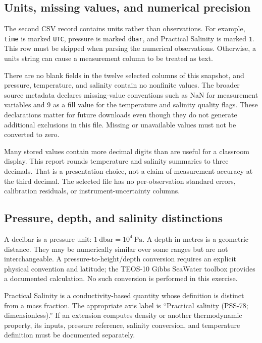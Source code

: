 \documentclass[11pt,letterpaper]{article}
\newcommand{\field}[1]{\nolinkurl{#1}}
\begin{document}
\subsection{Units, missing values, and numerical precision}
The second CSV record contains units rather than observations. For example, \field{time} is marked \field{UTC}, pressure is marked \field{dbar}, and Practical Salinity is marked \field{1}. This row must be skipped when parsing the numerical observations. Otherwise, a units string can cause a measurement column to be treated as text.

There are no blank fields in the twelve selected columns of this snapshot, and pressure, temperature, and salinity contain no nonfinite values. The broader source metadata declares missing-value conventions such as NaN for measurement variables and 9 as a fill value for the temperature and salinity quality flags. These declarations matter for future downloads even though they do not generate additional exclusions in this file. Missing or unavailable values must not be converted to zero.

Many stored values contain more decimal digits than are useful for a classroom display. This report rounds temperature and salinity summaries to three decimals. That is a presentation choice, not a claim of measurement accuracy at the third decimal. The selected file has no per-observation standard errors, calibration residuals, or instrument-uncertainty columns.

\subsection{Pressure, depth, and salinity distinctions}
A decibar is a pressure unit: $1\ \mathrm{dbar}=10^{4}\ \mathrm{Pa}$. A depth in metres is a geometric distance. They may be numerically similar over some ranges but are not interchangeable. A pressure-to-height/depth conversion requires an explicit physical convention and latitude; the TEOS-10 Gibbs SeaWater toolbox provides a documented calculation.\cite{gswdepth} No such conversion is performed in this exercise.

Practical Salinity is a conductivity-based quantity whose definition is distinct from a mass fraction.\cite{gswsalinity} The appropriate axis label is ``Practical salinity (PSS-78; dimensionless).'' If an extension computes density or another thermodynamic property, its inputs, pressure reference, salinity conversion, and temperature definition must be documented separately.
\end{document}
